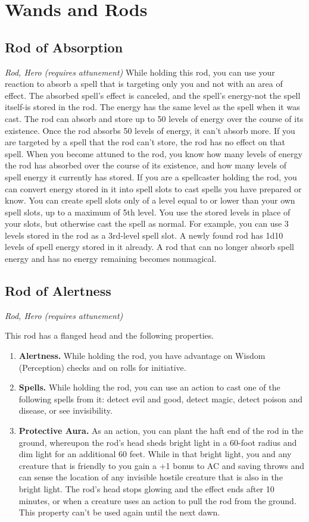 \section{Wands and Rods}

\subsection{Rod of Absorption}
\textit{Rod, Hero (requires attunement)}
While holding this rod, you can use your reaction to absorb a spell that is targeting only you and not with an area of effect. The absorbed spell's effect is canceled, and the spell's energy-not the spell itself-is stored in the rod. The energy has the same level as the spell when it was cast. The rod can absorb and store up to 50 levels of energy over the course of its existence. Once the rod absorbs 50 levels of energy, it can't absorb more. If you are targeted by a spell that the rod can't store, the rod has no effect on that spell.
When you become attuned to the rod, you know how many levels of energy the rod has absorbed over the course of its existence, and how many levels of spell energy it currently has stored.
If you are a spellcaster holding the rod, you can convert energy stored in it into spell slots to cast spells you have prepared or know. You can create spell slots only of a level equal to or lower than your own spell slots, up to a maximum of 5th level. You use the stored levels in place of your slots, but otherwise cast the spell as normal. For example, you can use 3 levels stored in the rod as a 3rd-level spell slot.
A newly found rod has 1d10 levels of spell energy stored in it already. A rod that can no longer absorb spell energy and has no energy remaining becomes nonmagical.

\subsection{Rod of Alertness}
\textit{Rod, Hero (requires attunement)}

This rod has a flanged head and the following properties.
\begin{enumerate}

\item \textbf{Alertness.} While holding the rod, you have advantage on Wisdom (Perception) checks and on rolls for initiative.
\item \textbf{Spells.} While holding the rod, you can use an action to cast one of the following spells from it: detect evil and good, detect magic, detect poison and disease, or see invisibility.
\item \textbf{Protective Aura.} As an action, you can plant the haft end of the rod in the ground, whereupon the rod's head sheds bright light in a 60-foot radius and dim light for an additional 60 feet. While in that bright light, you and any creature that is friendly to you gain a +1 bonus to AC and saving throws and can sense the location of any invisible hostile creature that is also in the bright light.  The rod's head stops glowing and the effect ends after 10 minutes, or when a creature uses an action to pull the rod from the ground. This property can't be used again until the next dawn.
\end{enumerate}

